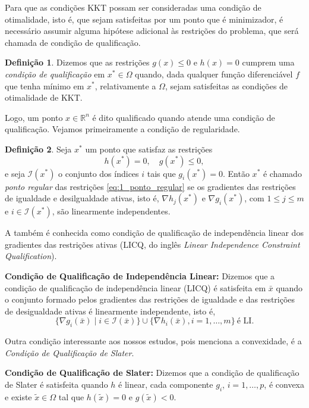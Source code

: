 \documentclass[12pt,a4paper]{scrartcl}
\def\RR{\mathds{R}}
\def\xbar{\bar{x}}
\theoremstyle{definition}%
\newtheorem{defi}{Definição}
\begin{document}
Para que as condições KKT possam ser consideradas uma condição de otimalidade, isto é, que sejam satisfeitas por um ponto que é minimizador, é necessário assumir alguma hipótese adicional às restrições do problema, que será chamada de condição de qualificação.

\begin{defi}
Dizemos que as restrições $g(x) \leq 0$ e $h(x)=0$ cumprem uma \emph{condição de qualificação} em $x^{*} \in \Omega$ quando, dada qualquer função diferenciável $f$ que tenha mínimo em $x^{*}$, relativamente a $\Omega$, sejam satisfeitas as condições de otimalidade de KKT.
\end{defi}
Logo, um ponto $x \in \RR^{n}$ é dito qualificado quando atende uma condição de qualificação. Vejamos primeiramente a condição de regularidade.

\begin{defi} \label{defi:ponto_regular}
Seja $x^{*}$ um ponto que satisfaz as restrições
\[
h(x^{*}) = 0, \quad g(x^{*}) \leq 0, \label{eq:1_ponto_regular}
\]
e seja $\mathcal{I}(x^{*})$ o conjunto dos índices $i$ tais que $g_{i}(x^{*}) = 0$. Então $x^{*}$ é chamado \emph{ponto regular} das restrições \eqref{eq:1_ponto_regular} se os gradientes das restrições de igualdade e desilgualdade ativas, isto é, $\nabla h_{j}(x^{*})$ e $\nabla g_{i}(x^{*})$, com $1 \leq j \leq m$ e $i \in \mathcal{I}(x^{*})$, são linearmente independentes.
\end{defi}

A  também é conhecida como condição de qualificação de independência linear dos gradientes das restrições ativas (LICQ, do inglês \emph{Linear Independence Constraint Qualification}).

\textbf{Condição de Qualificação de Independência Linear:} Dizemos que a condição de qualificação de independência linear (LICQ) é satisfeita em $\xbar$ quando o conjunto formado pelos gradientes das restrições de igualdade e das restrições de desigualdade ativas é linearmente independente, isto é, 
\[
\{ \nabla g_{i}(\xbar) \mid i \in \mathcal{I}(\xbar) \} \cup \{ \nabla h_{i}(\xbar), i=1, \ldots , m \} \ \text{é LI}.
\] 

Outra condição interessante aos nossos estudos, pois menciona a convexidade, é a \emph{Condição de Qualificação de Slater}.

\textbf{Condição de Qualificação de Slater:} Dizemos que a condição de qualificação de Slater é satisfeita quando $h$ é linear, cada componente $g_{i}$, $i=1, \ldots , p$, é convexa e existe $\tilde{x} \in \Omega$ tal que $h(\tilde{x})=0$ e $g(\tilde{x})<0$.
\end{document}
